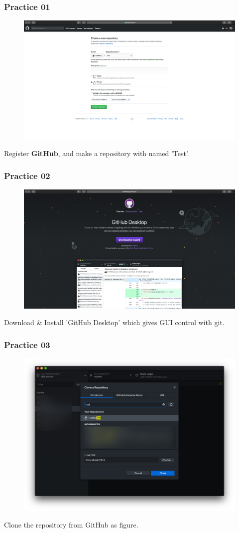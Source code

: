 \documentclass[aspectratio=169]{beamer}
\begin{document}
	\begin{frame}
		\frametitle{Practice 01}
		
		\begin{figure}
			\centering
			\includegraphics[width=0.6 \linewidth]{figures/1.png}
		\end{figure}
	
		Register \textbf{GitHub}, and make a repository with named 'Test'.
	\end{frame}

	\begin{frame}
		\frametitle{Practice 02}
		
		\begin{figure}
			\centering
			\includegraphics[width=0.6 \linewidth]{figures/2.png}
		\end{figure}
	
		Download \& Install 'GitHub Desktop' which gives GUI control with git. 
	\end{frame}

	\begin{frame}
		\frametitle{Practice 03}
		
		\begin{figure}
			\centering
			\includegraphics[width=0.5 \linewidth]{figures/3.png}
		\end{figure}
	
		Clone the repository from GitHub as figure. 
	\end{frame}
\end{document}
